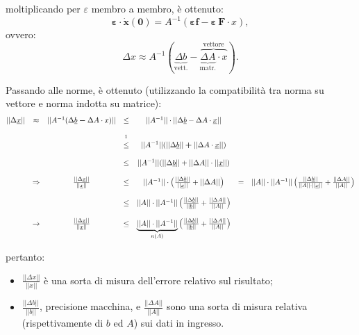 moltiplicando per $\varepsilon$ membro a membro, è ottenuto:
\begin{equation}
    \boldsymbol{\varepsilon\cdot\dot x(0)} = A^{-1}(\boldsymbol{\varepsilon f} - \boldsymbol{\varepsilon\,F}\cdot x),
\end{equation}
ovvero:
\begin{equation*}
    \Delta x\approx A^{-1}(\underbrace{\Delta b}_{\text{vett.}}- \overbrace{\underbrace{\Delta A}_{\text{matr.}}\cdot x}^{\text{vettore}}).
\end{equation*}

Passando alle norme, è ottenuto (utilizzando la compatibilità tra norma su vettore e norma indotta su matrice):
\begin{equation}\label{eq:condizionamento_sistema_lineare}
    \begin{matrix}
        ||\Delta \uline x|| &\approx& ||A^{-1}(\Delta\uline b \boldsymbol- \Delta A\cdot x)|| &\leq& ||A^{-1}||\cdot ||\Delta\uline b - \Delta A\cdot \uline x||\\\\
        &&&\overset{\footnotemark}{\leq}& ||A^{-1}|| (||\Delta\uline b||\boldsymbol + ||\Delta A\cdot \uline x||) \\\\
        && &\leq& ||A^{-1}|| (||\Delta\uline b|| + ||\Delta A||\cdot ||\uline x||)\\\\
        &\Rightarrow& \frac{||\Delta \uline x||}{||\uline x||}&\leq& ||A^{-1}|| \cdot\left(\frac{||\Delta\uline b||}{||\uline x||} + ||\Delta A||\right) &=& ||A||\cdot||A^{-1}||\left(\frac{||\Delta\uline b||}{||A||\cdot ||\uline x||} + \frac{||\Delta A||}{||A||}\right)\\\\
        & &  &\leq& ||A||\cdot||A^{-1}||\left(\frac{||\Delta\uline b||}{||\uline b||} + \frac{||\Delta A||}{||A||}\right)\\\\
        &\rightarrow& \frac{||\Delta\uline x||}{||\uline x||} &\leq& \underbrace{||A||\cdot||A^{-1}||}_{\kappa(A)}\left(\frac{||\Delta\uline b||}{||\uline b||} + \frac{||\Delta A||}{||A||}\right)
    \end{matrix}
\end{equation}

pertanto:
\begin{itemize}
    \item $\frac{||\Delta x||}{||x||}$ è una sorta di misura dell'errore relativo sul risultato;
    \item $\frac{||\Delta b||}{||b||}$, precisione macchina, e $\frac{||\Delta A||}{||A||}$ sono una sorta di misura relativa (rispettivamente di $b$ ed $A$) sui dati in ingresso.
\end{itemize}

